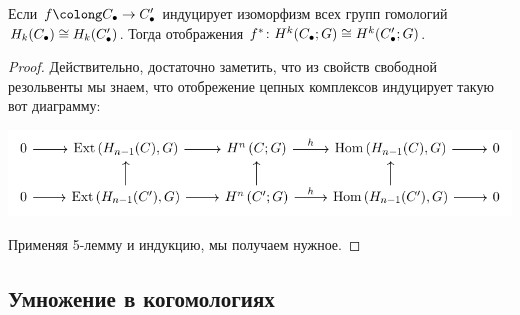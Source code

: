     \begin{corollary}
        Если $f\colong C_{\bullet} \to C_{\bullet}'$ индуцирует изоморфизм всех групп гомологий $H_{k}(C_{\bullet}) \cong H_{k}\lr*{C_{\bullet}'}$.
        Тогда отображения $f^{*}\colon H^{k}\lr*{C_{\bullet}; G} \cong H^{k}\lr*{C_{\bullet}'; G}$.
    \end{corollary}
    \begin{proof}
        Действительно, достаточно заметить, что из свойств свободной резольвенты мы знаем, что отобрежение цепных комплексов индуцирует такую вот диаграмму:
        \begin{center}
            \includegraphics{lectures/0/pictures/cd_14}
        \end{center}
        Применяя 5-лемму и индукцию, мы получаем нужное.
    \end{proof}

    \subsection{Умножение в когомологиях}

